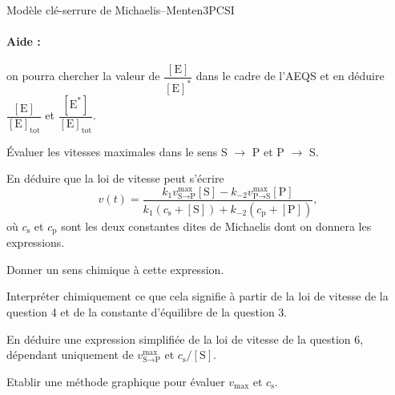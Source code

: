 \begin{exercise}{Modèle clé-serrure de Michaelis--Menten}{3}{PCSI}
\begin{questions}
\paragraph{Aide :} on pourra chercher la valeur de $\dfrac{[\text{E}]}{[\text{E}]^\ast}$ dans le cadre de l'AEQS et en déduire $\dfrac{[\text{E}]}{[\text{E}]_\text{tot}}$ et  $\dfrac{[\text{E}^\ast]}{[\text{E}]_\text{tot}}$.

\question \'Evaluer les vitesses maximales dans le sens S $\rightarrow$ P et P $\rightarrow$ S.

\question En déduire que la loi de vitesse peut s'écrire
$$v(t) = \dfrac{k_1 v^\text{max}_{\text{S} \rightarrow \text{P}}[\text{S}] - k_{-2} v^\text{max}_{\text{P} \rightarrow \text{S}}[\text{P}]}{k_1(c_\text{s} + [\text{S}]) + k_{-2}(c_\text{p} + [\text{P}])},$$
où $c_\text{s}$ et $c_\text{p}$ sont les deux constantes dites de Michaelis dont on donnera les expressions.

Donner un sens chimique à cette expression.


\question Interpréter chimiquement ce que cela signifie à partir de la loi de vitesse de la question 4 et de la constante d'équilibre de la question 3.

\question En déduire une expression simplifiée de la loi de vitesse de la question 6, dépendant uniquement de $v^\text{max}_{\text{S} \rightarrow \text{P}}$ et $c_\text{s}/[\text{S}]$.

\question Etablir une méthode graphique pour évaluer $v_\text{max}$ et $c_\text{s}$.

\end{questions}

\end{exercise}



